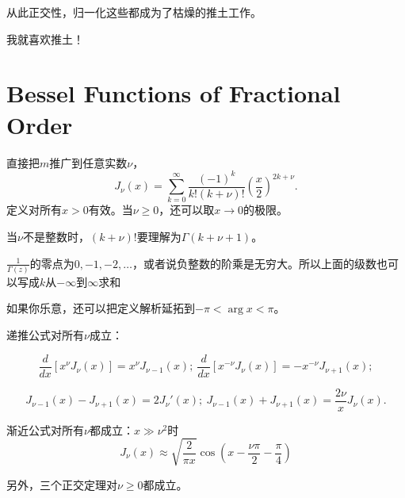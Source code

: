\documentclass[CJK]{beamer}
\begin{document}
\begin{frame}
\bch

{\large 从此正交性，归一化这些都成为了枯燥的推土工作。}

\bcenter
{}

我就喜欢推土！

\ecenter
\ech
\end{frame}


\section{Bessel Functions of Fractional Order}

\begin{frame}
\bch
直接把$m$推广到任意实数$\nu$，
\tbox
    {$$J_\nu(x) = \sum_{k=0}^\infty \frac{(-1)^k}{k!(k+\nu)!} \left(\frac{x}{2}\right)^{2k+\nu}.$$}
    定义对所有$x>0$有效。当$\nu \ge 0$，还可以取$x \rightarrow 0$的极限。


    
    \skiplines
    \bitem
  \item{当$\nu$不是整数时，$(k+\nu)!$要理解为$\Gamma(k+\nu+1)$。}
  \item{$\frac{1}{\Gamma(z)}$的零点为$0,-1,-2,\ldots$，或者说负整数的阶乘是无穷大。所以上面的级数也可以写成$k$从$-\infty$到$\infty$求和}
  \item{如果你乐意，还可以把定义解析延拓到$-\pi<\arg x<\pi$。}
    \eitem
\ech
\end{frame}


\begin{frame}
\bch
递推公式对所有$\nu$成立：{\blue
  $$ \frac{d}{dx}\left[x^\nu J_\nu(x)\right] = x^\nu J_{\nu -1}(x);\ \frac{d}{dx}\left[x^{-\nu} J_\nu(x)\right] = -x^{-\nu} J_{\nu +1}(x);  $$

$$ J_{\nu-1}(x)-J_{\nu+1}(x) =2J_\nu'(x) ;\  J_{\nu-1}(x)+J_{\nu+1}(x) = \frac{2\nu}{x}J_\nu(x).$$}



渐近公式对所有$\nu$都成立：{\blue $x\gg \nu^2$时
$$ J_\nu(x)\approx \sqrt{\frac{2}{\pi x}}\cos{\left(x - \frac{\nu \pi}{2} - \frac{\pi}{4}\right)} $$}

另外，{\blue 三个正交定理对$\nu \ge 0 $都成立}。

\ech
\end{frame}
\end{document}
